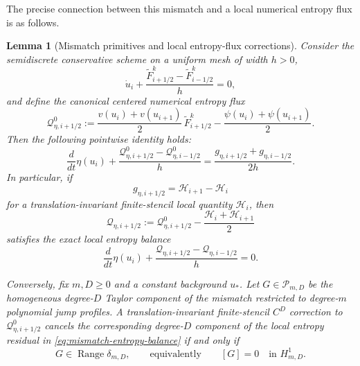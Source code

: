 \documentclass[11pt]{amsart}
\theoremstyle{plain}
\newtheorem{lemma}[theorem]{Lemma}
\theoremstyle{definition}
\theoremstyle{remark}
\numberwithin{equation}{section}
\theoremstyle{plain}
\begin{document}
The precise connection between this mismatch and a local numerical entropy
flux is as follows.

\begin{lemma}[Mismatch primitives and local entropy-flux corrections]
	\label{lem:mismatch-entropy-flux-correction}
	Consider the semidiscrete conservative scheme on a uniform mesh of width
	$h>0$,
	\begin{equation}\label{eq:semidiscrete-FMT-scheme}
		\dot u_i
		+\frac{\widetilde F^k_{i+1/2}-\widetilde F^k_{i-1/2}}{h}
		=0,
	\end{equation}
	and define the canonical centered numerical entropy flux
	\begin{equation}\label{eq:canonical-centered-entropy-flux}
		\mathcal Q^0_{\eta,i+1/2}
		:=
		\frac{v(u_i)+v(u_{i+1})}{2}\,
		\widetilde F^k_{i+1/2}
		-\frac{\psi(u_i)+\psi(u_{i+1})}{2}.
	\end{equation}
	Then the following pointwise identity holds:
	\begin{equation}\label{eq:mismatch-entropy-balance}
		\frac{d}{dt}\eta(u_i)
		+\frac{\mathcal Q^0_{\eta,i+1/2}
		-\mathcal Q^0_{\eta,i-1/2}}{h}
		=
		\frac{g_{\eta,i+1/2}+g_{\eta,i-1/2}}{2h}.
	\end{equation}
	In particular, if
	\begin{equation}\label{eq:full-mismatch-local-primitive}
		g_{\eta,i+1/2}=\mathcal H_{i+1}-\mathcal H_i
	\end{equation}
	for a translation-invariant finite-stencil local quantity $\mathcal H_i$,
	then
	\begin{equation}\label{eq:corrected-local-entropy-flux}
		\mathcal Q_{\eta,i+1/2}
		:=
		\mathcal Q^0_{\eta,i+1/2}
		-\frac{\mathcal H_i+\mathcal H_{i+1}}{2}
	\end{equation}
	satisfies the exact local entropy balance
	\begin{equation}\label{eq:corrected-local-entropy-balance}
		\frac{d}{dt}\eta(u_i)
		+\frac{\mathcal Q_{\eta,i+1/2}
		-\mathcal Q_{\eta,i-1/2}}{h}
		=0.
	\end{equation}

	Conversely, fix $m,D\ge0$ and a constant background $u_*$.  Let
	$G\in\mathscr P_{m,D}$ be the homogeneous degree-$D$ Taylor component of
	the mismatch restricted to degree-$m$ polynomial jump profiles.  A
	translation-invariant finite-stencil $C^D$ correction to
	$\mathcal Q^0_{\eta,i+1/2}$ cancels the corresponding degree-$D$ component
	of the local entropy residual in \eqref{eq:mismatch-entropy-balance} if and
	only if
	\begin{equation}\label{eq:entropy-correction-coboundary-equivalence}
		G\in\operatorname{Range}\delta_{m,D},
		\qquad\text{equivalently}\qquad
		[G]=0\quad\text{in }H^1_{m,D}.
	\end{equation}
\end{lemma}
\end{document}
